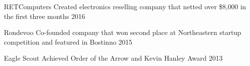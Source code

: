 

\begin{cvhonors}

  \cvhonor
    {RETComputers} %
    {Created electronics reselling company that netted over \$8,000 in the first three months} %
    {2016} %

  \cvhonor
    {Rondevoo} %
    {Co-founded company that won second place at Northeastern startup competition and featured in Bostinno} %
    {2015} %

  \cvhonor
    {Eagle Scout} %
    {Achieved Order of the Arrow and Kevin Hanley Award} %
    {2013} %

\end{cvhonors}
